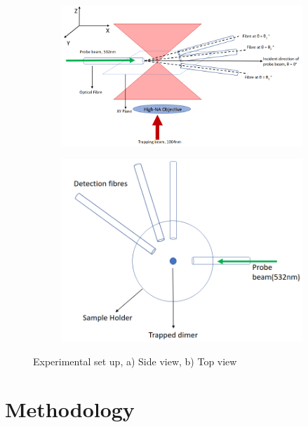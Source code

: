 \documentclass[final, 3p]{elsarticle}
\begin{document}
\begin{figure}
	\centering
	\begin{subfigure}{0.45\textwidth}
		\includegraphics[width=\textwidth, height=0.25\textheight]{./Images/fig1a.png}
		\subcaption{}
	\end{subfigure}
	\begin{subfigure}{0.45\textwidth}
		\includegraphics[width=\textwidth, height=0.25\textheight]{./Images/fig1b.png}
		\subcaption{}
	\end{subfigure}
	\caption{Experimental set up, a) Side view, b) Top view }
	\label{fig:setup}
\end{figure}

\section{Methodology}
\label{sec:Method}
\end{document}
